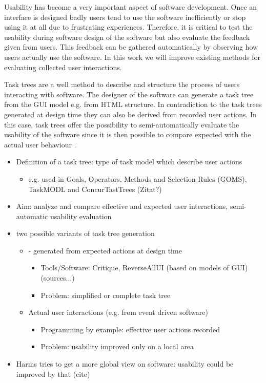 Usability has become a very important aspect of software development. 
Once an interface is designed badly users tend to use the software inefficiently or stop using it at all due to frustrating experiences.
Therefore, it is critical to test the usability during software design of the software but also evaluate the feedback given from users. 
This feedback can be gathered automatically by observing how users actually use the software.
In this work we will improve existing methods for evaluating collected user interactions.

Task trees are a well method to describe and structure the process of users interacting with software. 
The designer of the software can generate a task tree from the GUI model e.g. from HTML structure. 
In contradiction to the task trees generated at design time they can also be derived from recorded user actions. 
In this case, task trees offer the possibility to semi-automatically evaluate the usability of the software since it is then possible to compare expected with the actual user behaviour \citep{harms2013}.  

\begin{itemize}
	\item Definition of a task tree: type of task model which describe user actions
    	\begin{itemize}
		\item  e.g. used in Goals, Operators, Methods and Selection Rules (GOMS), TaskMODL and ConcurTastTrees (Zitat?)
	\end{itemize}
	\item Aim: analyze and compare effective and expected user interactions, semi-automatic usability evaluation
	\item two possible variants of task tree generation 
 	\begin{itemize}
		\item - generated from expected actions at design time
      		\begin{itemize}
			\item Tools/Software: Critique, ReverseAllUI (based on models of GUI) (sources...)
     			\item Problem: simplified or complete task tree
		\end{itemize}
		\item Actual user interactions (e.g. from event driven software)
     		\begin{itemize} 
			\item Programming by example: effective user actions recorded
			\item Problem: usability improved only on a local area
		\end{itemize}
	\end{itemize}
	\item Harms tries to get a more global view on software: usability could be improved by that (cite) 
\end{itemize}



